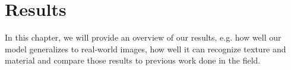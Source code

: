 \chapter{Results}
\label{kap:results}

In this chapter, we will provide an overview of our results, e.g. how well our model generalizes to real-world images, how well it can recognize texture and material and compare those results to previous work done in the field. 